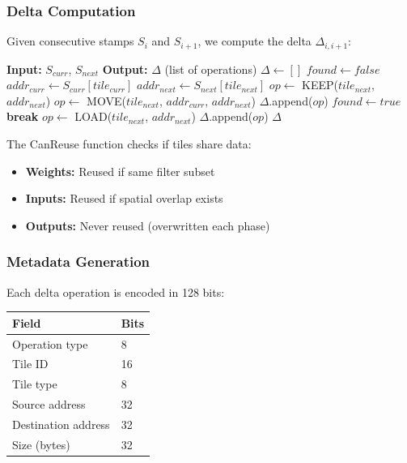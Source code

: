 \documentclass[conference]{IEEEtran}
\begin{document}
\subsubsection{Delta Computation}

Given consecutive stamps $S_i$ and $S_{i+1}$, we compute the delta $\Delta_{i,i+1}$:

\begin{algorithm}[t]
\caption{Delta Computation}
\label{alg:delta_comp}
\begin{algorithmic}[1]
\STATE \textbf{Input:} $S_{curr}$, $S_{next}$
\STATE \textbf{Output:} $\Delta$ (list of operations)
\STATE $\Delta \gets []$
  \STATE $found \gets false$
      \STATE $addr_{curr} \gets S_{curr}[tile_{curr}]$
      \STATE $addr_{next} \gets S_{next}[tile_{next}]$
        \STATE $op \gets $ KEEP($tile_{next}$, $addr_{next}$)
      \ELSE
        \STATE $op \gets $ MOVE($tile_{next}$, $addr_{curr}$, $addr_{next}$)
      \ENDIF
      \STATE $\Delta$.append($op$)
      \STATE $found \gets true$
      \STATE \textbf{break}
    \ENDIF
  \ENDFOR
    \STATE $op \gets $ LOAD($tile_{next}$, $addr_{next}$)
    \STATE $\Delta$.append($op$)
  \ENDIF
\ENDFOR
\RETURN $\Delta$
\end{algorithmic}
\end{algorithm}

The CanReuse function checks if tiles share data:
\begin{itemize}
\item \textbf{Weights:} Reused if same filter subset
\item \textbf{Inputs:} Reused if spatial overlap exists
\item \textbf{Outputs:} Never reused (overwritten each phase)
\end{itemize}

\subsubsection{Metadata Generation}

Each delta operation is encoded in 128 bits:

\begin{center}
\begin{tabular}{ll}
\toprule
\textbf{Field} & \textbf{Bits} \\
\midrule
Operation type & 8 \\
Tile ID & 16 \\
Tile type & 8 \\
Source address & 32 \\
Destination address & 32 \\
Size (bytes) & 32 \\
\bottomrule
\end{tabular}
\end{center}
\end{document}
